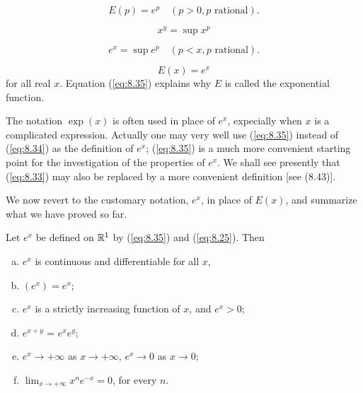 \begin{equation}
    \label{eq:8.32}
    E(p) = e^p
    \quad (p>0, p \text{ rational}).
\end{equation}

\begin{equation}
    \label{eq:8.33}
    x^y = \sup x^p
\end{equation}

\begin{equation}
    \label{eq:8.34}
    e^x = \sup e^p
    \quad (p<x, p \text{ rational}).
\end{equation}

\begin{equation}
    \label{eq:8.35}
    E(x) = e^x
\end{equation}
for all real $x$. Equation (\ref{eq:8.35}) explains why $E$ is called the exponential function.

The notation $\exp(x)$ is often used in place of $e^x$, 
expecially when $x$ is a complicated expression.
Actually one may very well use (\ref{eq:8.35}) instead of (\ref{eq:8.34}) as the definition of $e^x$;
(\ref{eq:8.35}) is a much more convenient starting point for the investigation of the properties of $e^x$. 
We shall see presently that (\ref{eq:8.33}) may also be replaced by a
more convenient definition 
[see (8.43)].

We now revert to the customary notation, $e^x$, in place of $E(x)$, 
and summarize what we have proved so far.

\begin{thm}
    \label{thm:8.6}
    Let $e^x$ be defined on ${\protect\mathbb R}^1$ by (\ref{eq:8.35}) and (\ref{eq:8.25}). Then
    \begin{enumerate}[(a)]
        \item $e^x$ is continuous and differentiable for all $x$,
        \item $(e^x) = e^x$;
        \item $e^x$ is a strictly increasing function of $x$, and $e^x > 0$;
        \item $e^{x+y}$ = $e^x e^y$;
        \item $e^x \rightarrow +\infty$ as $x \rightarrow +\infty$, $e^x \rightarrow 0$ as $x \rightarrow 0$;
        \item $\lim_{x \to +\infty}  x^n e^{-x} = 0$, for every $n$.
    \end{enumerate}
\end{thm}


